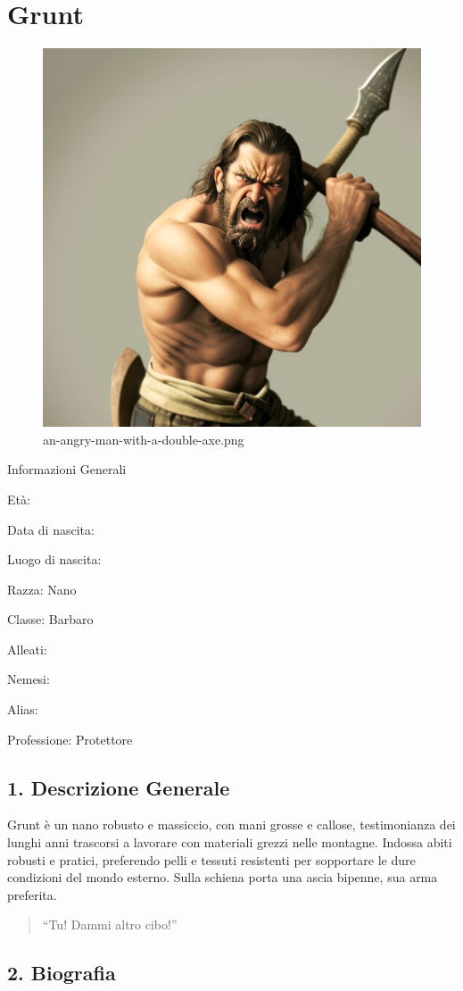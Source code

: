 \section{Grunt}


\begin{figure}
\centering
\includegraphics{an-angry-man-with-a-double-axe.png}
\caption{an-angry-man-with-a-double-axe.png}
\end{figure}

Informazioni Generali

Età:

Data di nascita:

Luogo di nascita:

Razza: Nano

Classe: Barbaro

Alleati:

Nemesi:

Alias:

Professione: Protettore


\subsection{1. Descrizione Generale}\label{descrizione-generale}


Grunt è un nano robusto e massiccio, con mani grosse e callose,
testimonianza dei lunghi anni trascorsi a lavorare con materiali grezzi
nelle montagne. Indossa abiti robusti e pratici, preferendo pelli e
tessuti resistenti per sopportare le dure condizioni del mondo esterno.
Sulla schiena porta una ascia bipenne, sua arma preferita.

\begin{quote}
``Tu! Dammi altro cibo!''
\end{quote}

\subsection{2. Biografia}\label{biografia}


